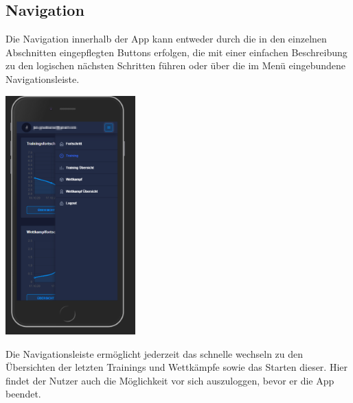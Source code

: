 \documentclass[a4paper]{article}
\begin{document}
	\subsection*{Navigation}
	Die Navigation innerhalb der App kann entweder durch die in den einzelnen Abschnitten eingepflegten Buttons erfolgen, die mit einer einfachen Beschreibung zu den logischen nächsten Schritten führen oder über die im Menü eingebundene Navigationsleiste.
	\begin{center}
		\includegraphics[width= 5cm, keepaspectratio]{img/nav}
	\end{center}
	Die Navigationsleiste ermöglicht jederzeit das schnelle wechseln zu den Übersichten der letzten Trainings und Wettkämpfe sowie das Starten dieser. Hier findet der Nutzer auch die Möglichkeit vor sich auszuloggen, bevor er die App beendet.  
\end{document}
